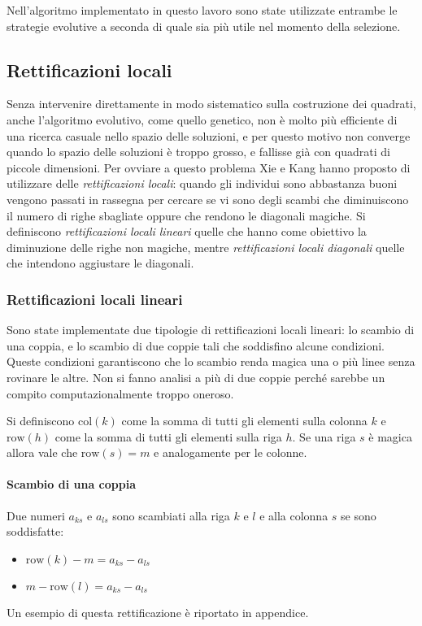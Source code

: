 \documentclass[italian,twoside,twocolumn]{article}
\begin{document}
Nell'algoritmo implementato in questo lavoro sono state utilizzate entrambe le strategie evolutive a seconda di quale sia più utile nel momento della selezione. 

\subsection{Rettificazioni locali}

Senza intervenire direttamente in modo sistematico sulla costruzione dei quadrati, anche l'algoritmo evolutivo, come quello genetico, non è molto più efficiente di una ricerca casuale nello spazio delle soluzioni, e per questo motivo non converge quando lo spazio delle soluzioni è troppo grosso, e fallisse già con quadrati di piccole dimensioni. Per ovviare a questo problema Xie e Kang hanno proposto di utilizzare delle \emph{rettificazioni locali}: quando gli individui sono abbastanza buoni vengono passati in rassegna per cercare se vi sono degli scambi che diminuiscono il numero di righe sbagliate oppure che rendono le diagonali magiche. Si definiscono \emph{rettificazioni locali lineari} quelle che hanno come obiettivo la diminuzione delle righe non magiche, mentre \emph{rettificazioni locali diagonali} quelle che intendono aggiustare le diagonali.

\subsubsection{Rettificazioni locali lineari}
Sono state implementate due tipologie di rettificazioni locali lineari: lo scambio di una coppia, e lo scambio di due coppie tali che soddisfino alcune condizioni. Queste condizioni garantiscono che lo scambio renda magica una o più linee senza rovinare le altre. Non si fanno analisi a più di due coppie perché sarebbe un compito computazionalmente troppo oneroso. 

Si definiscono $ \text{col}(k) $ come la somma di tutti gli elementi sulla colonna $ k $ e $ \text{row}(h) $ come la somma di tutti gli elementi sulla riga $ h $. Se una riga $ s $ è magica allora vale che $ \text{row}(s) = \mathit{m}$ e analogamente per le colonne.

\paragraph{Scambio di una coppia} Due numeri $ a_{ks} $ e $ a_{ls} $ sono scambiati alla riga $ k $ e $ l $ e alla colonna $ s $ se sono soddisfatte: 
\begin{itemize}
	\item $ \text{row}(k) - \mathit{m} = a_{ks} - a_{ls} $
	\item $ \mathit{m} - \text{row}(l) = a_{ks} - a_{ls} $
\end{itemize}
Un esempio di questa rettificazione è riportato in appendice. 
\end{document}
